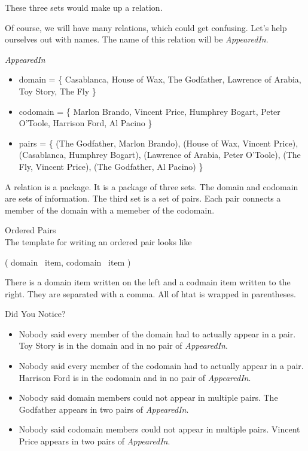 \documentclass{ximera}
\begin{document}
These three sets would make up a relation. 

Of course, we will have many relations, which could get confusing.  Let's help ourselves out with names.  The name of this relation will be \textit{AppearedIn}.


\begin{example} \textit{AppearedIn} \\
\begin{itemize}
\item domain = \{ Casablanca, House of Wax,  The Godfather, Lawrence of Arabia, Toy Story, The Fly \}  
\item codomain = \{ Marlon Brando, Vincent Price, Humphrey Bogart, Peter O'Toole, Harrison Ford, Al Pacino  \} 
\item pairs = \{ (The Godfather, Marlon Brando), (House of Wax, Vincent Price), (Casablanca, Humphrey Bogart), (Lawrence of Arabia, Peter O'Toole), (The Fly, Vincent Price), (The Godfather, Al Pacino) \} 
\end{itemize}
\end{example}


A relation is a package.  It is a package of three sets. The domain and codomain are sets of information.  The third set is a set of pairs.  Each pair connects a member of the domain with a memeber of the codomain. 


\begin{template} Ordered Pairs \\
The template for writing an ordered pair looks like  

\begin{center}
( domain \, item, codomain \, item )
\end{center}
\end{template}

There is a domain item written on the left and a codmain item written to the right.  They are separated with a comma.  All of htat is wrapped in parentheses.


\begin{warning} Did You Notice? \\
\begin{itemize}
\item Nobody said every member of the domain had to actually appear in a pair.  Toy Story is in the domain and in no pair of \textit{AppearedIn}.
\item Nobody said every member of the codomain had to actually appear in a pair.  Harrison Ford is in the codomain and in no pair of \textit{AppearedIn}.
\item Nobody said domain members could not appear in multiple pairs.  The Godfather appears in two pairs of \textit{AppearedIn}.
\item Nobody said codomain members could not appear in multiple pairs.  Vincent Price appears in two pairs of \textit{AppearedIn}.
\end{itemize}
\end{warning}
\end{document}
